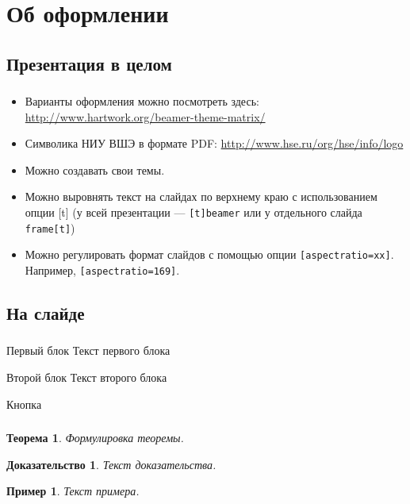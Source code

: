 \documentclass[t]{beamer}  %
\newtheorem{rtheorem}{Теорема}
\newtheorem{rproof}{Доказательство}
\newtheorem{rexample}{Пример}
\begin{document}
\section{Об оформлении}
\subsection{Презентация в целом}

\begin{frame}[c] %
	\frametitle{\insertsection}
	\framesubtitle{\insertsubsection}
	\begin{itemize}
		\item Варианты оформления можно посмотреть здесь:  \href{http://www.hartwork.org/beamer-theme-matrix/}{http://www.hartwork.org/beamer-theme-matrix/} 
		\item Символика НИУ ВШЭ в формате PDF: \href{http://www.hse.ru/org/hse/info/logo}{http://www.hse.ru/org/hse/info/logo}
		\item Можно создавать свои темы.
		\item Можно выровнять текст на слайдах по верхнему краю с использованием опции [t] (у всей презентации ---  \texttt{[t]{beamer}} или у отдельного слайда \texttt{{frame}[t]}) 
		\item Можно регулировать формат слайдов с помощью опции \texttt{[aspectratio=xx]}. Например, \texttt{[aspectratio=169]}. 
	\end{itemize}
\end{frame}

\subsection{На слайде}

\begin{frame}
	\frametitle{\insertsection}
	\framesubtitle{\insertsubsection}
    \begin{block}{Первый блок}
		Текст первого блока
	\end{block}
	\begin{block}{Второй блок}
		Текст второго блока
    \end{block}
	\begin{block}{Кнопка}
		\hyperlink{lab}{} 
	\end{block}
\end{frame}

\begin{frame}
	\frametitle{\insertsection}
	\framesubtitle{\insertsubsection}
    \begin{rtheorem}
		Формулировка теоремы.    
	\end{rtheorem}
	\begin{rproof}
		Текст доказательства.
    \end{rproof}
	\begin{rexample}
		Текст примера.
	\end{rexample}
\end{frame}
\end{document}
